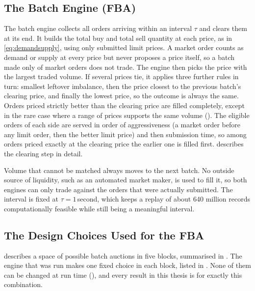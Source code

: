 \subsection{The Batch Engine (FBA)}

The batch engine collects all orders arriving within an interval $\tau$ and
clears them at its end. It builds the total buy and total sell quantity at each
price, as in \eqref{eq:demandsupply}, using only submitted limit prices. A
market order counts as demand or supply at every price but never proposes a
price itself, so a batch made only of market orders does not trade. The engine
then picks the price with the largest traded volume. If several prices tie, it
applies three further rules in turn: smallest leftover imbalance, then the
price closest to the previous batch's clearing price, and finally the lowest
price, so the outcome is always the same. Orders priced
strictly better than the clearing price are filled completely, except in the
rare case where a range of prices supports the same volume ().
The eligible orders of each side are served in order of aggressiveness (a
market order before any limit order, then the better limit price) and then
submission time, so among orders priced exactly at the clearing price the
earlier one is filled first.  describes the clearing step
in detail.

Volume that cannot be matched always moves to the next batch. No outside
source of liquidity, such as an automated market maker, is used to fill it, so
both engines can only trade against the orders that were actually submitted.
The interval is fixed at $\tau=1$\,second, which keeps a replay of about 640
million records computationally feasible while still being a meaningful
interval.

\subsection{The Design Choices Used for the FBA}
\label{sec:fbachoices}

 describes a space of possible batch auctions in five blocks,
summarised in . The engine that was run makes one fixed
choice in each block, listed in . None of them can be changed at run time
(), and every result in this thesis is for exactly this
combination.

